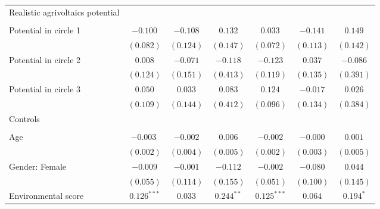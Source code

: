 \begin{center}
\begin{small}
\begin{longtable}{l@{} c@{} c@{} c@{} c@{} c@{} c@{}}
Realistic agrivoltaics potential    &                  &               &               &                 &                &               \\
                                    &                  &               &               &                 &                &               \\
\quad Potential in circle 1         & $-0.100$         & $-0.108$      & $0.132$       & $0.033$         & $-0.141$       & $0.149$       \\
                                    & $(0.082)$        & $(0.124)$     & $(0.147)$     & $(0.072)$       & $(0.113)$      & $(0.142)$     \\
\quad Potential in circle 2         & $0.008$          & $-0.071$      & $-0.118$      & $-0.123$        & $0.037$        & $-0.086$      \\
                                    & $(0.124)$        & $(0.151)$     & $(0.413)$     & $(0.119)$       & $(0.135)$      & $(0.391)$     \\
\quad Potential in circle 3         & $0.050$          & $0.033$       & $0.083$       & $0.124$         & $-0.017$       & $0.026$       \\
                                    & $(0.109)$        & $(0.144)$     & $(0.412)$     & $(0.096)$       & $(0.134)$      & $(0.384)$     \\
Controls                            &                  &               &               &                 &                &               \\
                                    &                  &               &               &                 &                &               \\
\quad Age                           & $-0.003^{\cdot}$ & $-0.002$      & $0.006$       & $-0.002$        & $-0.000$       & $0.001$       \\
                                    & $(0.002)$        & $(0.004)$     & $(0.005)$     & $(0.002)$       & $(0.003)$      & $(0.005)$     \\
\quad Gender: Female                & $-0.009$         & $-0.001$      & $-0.112$      & $-0.002$        & $-0.080$       & $0.044$       \\
                                    & $(0.055)$        & $(0.114)$     & $(0.155)$     & $(0.051)$       & $(0.100)$      & $(0.145)$     \\
\quad Environmental score           & $0.126^{***}$    & $0.033$       & $0.244^{**}$  & $0.125^{***}$   & $0.064$        & $0.194^{*}$   \\

\end{longtable}
\end{small}
\end{center}

